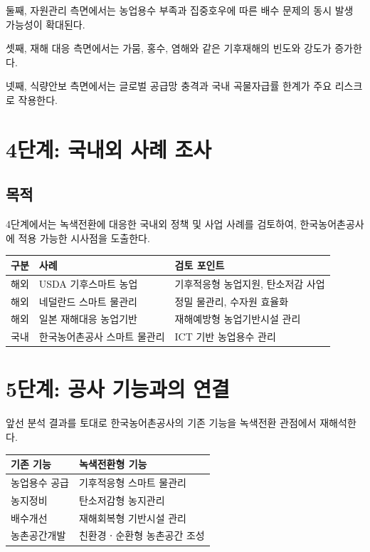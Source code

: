 \documentclass[11pt,a4paper]{article}
\begin{document}
둘째, 자원관리 측면에서는 농업용수 부족과 집중호우에 따른
배수 문제의 동시 발생 가능성이 확대된다.

셋째, 재해 대응 측면에서는 가뭄, 홍수, 염해와 같은
기후재해의 빈도와 강도가 증가한다.

넷째, 식량안보 측면에서는 글로벌 공급망 충격과
국내 곡물자급률 한계가 주요 리스크로 작용한다.

\section*{4단계: 국내외 사례 조사}

\subsection*{목적}

4단계에서는 녹색전환에 대응한 국내외 정책 및 사업 사례를 검토하여,
한국농어촌공사에 적용 가능한 시사점을 도출한다.

\begin{table}[h]
\centering
\renewcommand{\arraystretch}{1.3}
\begin{tabular}{p{4cm} p{5cm} p{5cm}}
\toprule
\rowcolor{gray!20}
구분 & 사례 & 검토 포인트 \\
\midrule
해외 & USDA 기후스마트 농업 & 기후적응형 농업지원, 탄소저감 사업 \\
해외 & 네덜란드 스마트 물관리 & 정밀 물관리, 수자원 효율화 \\
해외 & 일본 재해대응 농업기반 & 재해예방형 농업기반시설 관리 \\
국내 & 한국농어촌공사 스마트 물관리 & ICT 기반 농업용수 관리 \\
\bottomrule
\end{tabular}
\end{table}

\section*{5단계: 공사 기능과의 연결}

앞선 분석 결과를 토대로
한국농어촌공사의 기존 기능을 녹색전환 관점에서 재해석한다.

\begin{table}[h]
\centering
\renewcommand{\arraystretch}{1.3}
\begin{tabular}{p{5cm} p{9cm}}
\toprule
\rowcolor{gray!20}
기존 기능 & 녹색전환형 기능 \\
\midrule
농업용수 공급 & 기후적응형 스마트 물관리 \\
농지정비 & 탄소저감형 농지관리 \\
배수개선 & 재해회복형 기반시설 관리 \\
농촌공간개발 & 친환경ㆍ순환형 농촌공간 조성 \\
\bottomrule
\end{tabular}
\end{table}
\end{document}
